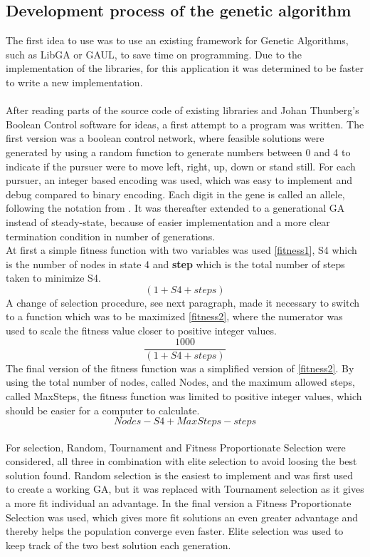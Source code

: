 \subsection{Development process of the genetic algorithm}
The first idea to use  was to use an existing framework for Genetic Algorithms, such as LibGA or GAUL, to save time on programming. Due to the implementation of the libraries, for this application it was determined to be faster to write a new implementation.\\
\\After reading parts of the source code of existing libraries and Johan Thunberg's Boolean Control software \cite{paper1} for ideas, a first attempt to a program was written. The first version was a boolean control network, where feasible solutions were generated by using a random function to generate numbers between 0 and 4 to indicate if the pursuer were to move left, right, up, down or stand still. For each pursuer, an integer based encoding was used, which was easy to implement and debug compared to binary encoding. Each digit in the gene is called an allele, following the notation from \cite{GA-ai}. It was thereafter extended to a generational GA instead of steady-state, because of easier implementation and a more clear termination condition in number of generations. \\
At first a simple fitness function with two variables was used \eqref{fitness1}, S4 which is the number of nodes in state 4 and \textbf{step} which is the total number of steps taken to minimize S4.
\begin{equation}\label{fitness1} (1+S4+steps) \end{equation}
A change of selection procedure, see next paragraph, made it necessary to switch to a function which was to be maximized \eqref{fitness2},  where the numerator was used to scale the fitness value closer to positive integer values.
\begin{equation}\label{fitness2} \frac{1000}{(1+S4+steps)} \end{equation}
The final version of the fitness function was a simplified version of \eqref{fitness2}. By using the total number of nodes, called Nodes,  and the maximum allowed steps, called MaxSteps, the fitness function was limited to positive integer values, which should be easier for a computer to calculate.
\begin{equation} \label{fitness3}Nodes-S4+MaxSteps-steps \end{equation}
\\For selection, Random, Tournament  and Fitness Proportionate Selection were considered, all three in combination with elite selection to avoid loosing the best solution found. Random selection is the easiest to implement and was first used to create a working GA, but it was replaced with Tournament selection as it gives a more fit individual an advantage. In the final version a Fitness Proportionate Selection was used, which gives more fit solutions an even greater advantage and thereby helps the population converge even faster. Elite selection was used to keep track of the two best solution each generation.\\
